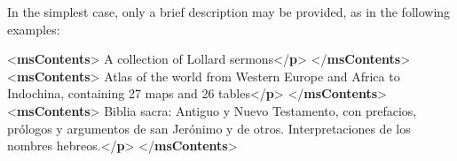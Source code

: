In the simplest case, only a brief description may be provided, as in the following examples: \par\bgroup{}\exampleFont \begin{shaded}\noindent\mbox{}{<\textbf{msContents}>}\mbox{}\newline 
{}A collection of Lollard sermons{</\textbf{p}>}\mbox{}\newline 
{</\textbf{msContents}>}\mbox{}\newline 
{<\textbf{msContents}>}\mbox{}\newline 
{}Atlas of the world from Western Europe and Africa to Indochina, containing 27\mbox{}\newline 
\hspace*{1em}\hspace*{1em} maps and 26 tables{</\textbf{p}>}\mbox{}\newline 
{</\textbf{msContents}>}\mbox{}\newline 
{<\textbf{msContents}>}\mbox{}\newline 
{}Biblia sacra: Antiguo y Nuevo Testamento, con prefacios, prólogos y\mbox{}\newline 
\hspace*{1em}\hspace*{1em} argumentos de san Jerónimo y de otros. Interpretaciones de los nombres\mbox{}\newline 
\hspace*{1em}\hspace*{1em} hebreos.{</\textbf{p}>}\mbox{}\newline 
{</\textbf{msContents}>}\end{shaded}\egroup\par \par
